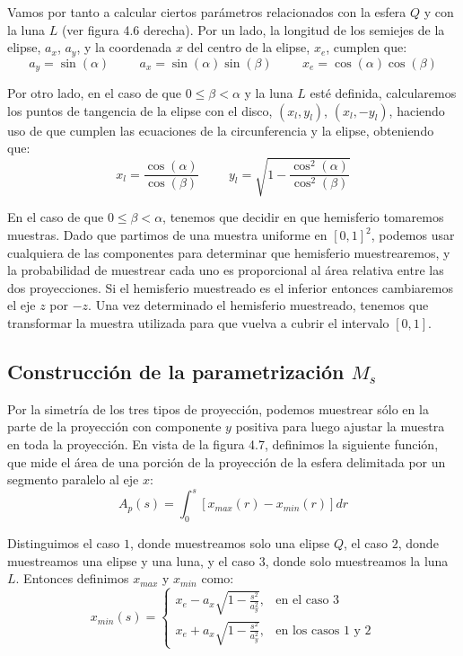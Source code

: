 Vamos por tanto a calcular ciertos parámetros relacionados con la esfera $Q$ y con la luna $L$ (ver figura 4.6 derecha). Por un lado, la longitud de los semiejes de la elipse, $a_x$, $a_y$, y la coordenada $x$ del centro de la elipse, $x_e$, cumplen que:
$$a_y=\sin(\alpha) \hspace{1cm} a_x=\sin(\alpha)\sin(\beta) \hspace{1cm} x_e=\cos(\alpha)\cos(\beta)$$

Por otro lado, en el caso de que $0\leq\beta<\alpha$ y la luna $L$ esté definida, calcularemos los puntos de tangencia de la elipse con el disco, $(x_l,y_l)$, $(x_l,-y_l)$, haciendo uso de que cumplen las ecuaciones de la circunferencia y la elipse, obteniendo que:
$$x_l = \frac{\cos(\alpha)}{\cos(\beta)}\hspace{1cm} y_l=\sqrt{1-\frac{\cos^2(\alpha)}{\cos^2(\beta)}}$$

En el caso de que $0\leq\beta<\alpha$, tenemos que decidir en que hemisferio tomaremos muestras. Dado que partimos de una muestra uniforme en $[0,1]^2$, podemos usar cualquiera de las componentes para determinar que hemisferio muestrearemos, y la probabilidad de muestrear cada uno es proporcional al área relativa entre las dos proyecciones. Si el hemisferio muestreado es el inferior entonces cambiaremos el eje $z$ por $-z$. Una vez determinado el hemisferio muestreado, tenemos que transformar la muestra utilizada para que vuelva a cubrir el intervalo $[0,1]$.

\subsection{Construcción de la parametrización $M_s$}
Por la simetría de los tres tipos de proyección, podemos muestrear sólo en la parte de la proyección con componente $y$ positiva para luego ajustar la muestra en toda la proyección. En vista de la figura 4.7, definimos la siguiente función, que mide el área de una porción de la proyección de la esfera delimitada por un segmento paralelo al eje $x$:
$$A_p(s) = \int_0^s [x_{max}(r)-x_{min}(r)]dr $$

Distinguimos el caso $1$, donde muestreamos solo una elipse $Q$, el caso $2$, donde muestreamos una elipse y una luna, y el caso $3$, donde solo muestreamos la luna $L$. Entonces definimos $x_{max}$ y $x_{min}$ como:
\[ x_{min}(s) = 
   \begin{cases} 
     x_e-a_x\sqrt{1-\frac{s^2}{a_y^2}},  & \text{en el caso $3$}  \\
     x_e+a_x\sqrt{1-\frac{s^2}{a_y^2}},  & \text{en los casos $1$ y $2$}
   \end{cases}
  \]

